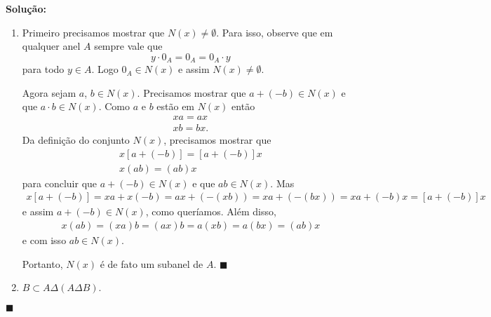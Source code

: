 \documentclass[12pt]{exam}
\renewcommand{\qedsymbol}{$\blacksquare$}
\begin{document}
    \noindent\textbf{Solu\c{c}\~ao:}
    \begin{enumerate}[label=({\roman*})]
        \item Primeiro precisamos mostrar que $N(x) \ne \emptyset$. Para isso, observe que em qualquer anel $A$ sempre vale que
            \[ y \cdot 0_A = 0_A = 0_A\cdot y\]
        para todo $y \in A$. Logo $0_A \in N(x)$ e assim $N(x) \ne \emptyset$.

        Agora sejam $a$, $b \in N(x)$. Precisamos mostrar que $a + (-b)\in N(x)$ e que $a\cdot b \in N(x)$. Como $a$ e $b$ estão em $N(x)$
        então
        \begin{align}
            xa = ax\\
            xb = bx.
        \end{align}
        Da definição do conjunto $N(x)$, precisamos mostrar que
        \begin{align}
            x[a + (-b)] = [a + (-b)]x\\
            x(ab) = (ab)x
        \end{align}
        para concluir que $a + (-b) \in N(x)$ e que $ab \in N(x)$. Mas
        \begin{align*}
            x[a + (-b)] = xa + x(-b) = ax + (-(xb)) = xa + (-(bx)) = xa + (-b)x = [a + (-b)]x
        \end{align*}
        e assim $a + (-b) \in N(x)$, como queríamos. Além disso,
        \begin{align*}
            x(ab) = (xa)b = (ax)b = a(xb) = a(bx) = (ab)x
        \end{align*}
        e com isso $ab \in N(x)$.

        Portanto, $N(x)$ é de fato um subanel de $A$. \hspace{.1cm} \qedsymbol
        \item $B \subset A \Delta (A \Delta B)$.
    \end{enumerate}

    \hspace{.1cm} \qedsymbol
\end{document}
